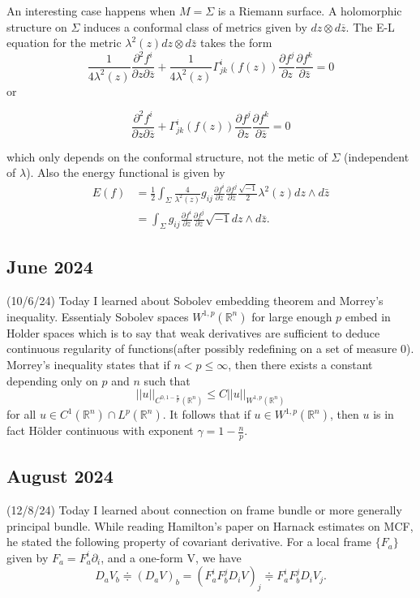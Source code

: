 \documentclass[12pt,a4paper]{article}
\newcommand{\R}{\mathbb{R}}
\begin{document}
An interesting case happens when $ M  = \Sigma$ is a Riemann surface. A holomorphic structure on $ \Sigma $ induces a conformal class of metrics given by $ dz \otimes d \overline{z} $. The E-L equation for the metric $ \lambda^{2}(z)dz \otimes d \bar{z} $ takes the form 
\[ \frac{1}{4\lambda^{2}(z)} \frac{\partial^{2}f^{i}}{\partial z \partial \overline{z}} + \frac{1}{4 \lambda^{2}(z)} \Gamma^{i}_{jk}(f(z)) \frac{\partial f^{j}}{\partial z}\frac{\partial f^{k}}{\partial \bar{z}} = 0\] or 

\[ \frac{\partial^{2}f^{i}}{\partial z \partial \overline{z}} + \Gamma^{i}_{jk}(f(z)) \frac{\partial f^{j}}{\partial z}\frac{\partial f^{k}}{\partial \bar{z}} = 0 \]

which only depends on the conformal structure, not the metic of $\Sigma $ (independent of $ \lambda $). Also the energy functional is given by 
\begin{align*}
    E(f) & =\frac{1}{2} \int_{\Sigma} \frac{4}{\lambda^2(z)} g_{i j} \frac{\partial f^i}{\partial z} \frac{\partial f^j}{\partial \bar{z}} \frac{\sqrt{-1}}{2} \lambda^2(z) d z \wedge d \bar{z} \\
    & =\int_{\Sigma} g_{i j} \frac{\partial f^i}{\partial z} \frac{\partial f^j}{\partial \bar{z}} \sqrt{-1} d z \wedge d \bar{z} .
    \end{align*}
\subsection*{June 2024}
\quad (10/6/24) Today I learned about Sobolev embedding theorem and Morrey's inequality. Essentialy Sobolev spaces $ W^{1,p}(\R^{n}) $ for large enough $ p $ embed in Holder spaces which is to say that weak derivatives are sufficient to deduce continuous regularity of functions(after possibly redefining on a set of measure $0$). Morrey's inequality states that if $n< p \le \infty$, then there exists a constant depending only on $ p $ and $n$ such that 
    \[ ||u||_{C^{0, 1 - \frac{n}{p}}(\R^{n})} \le C||u||_{W^{1,p}(\R^{n})} \]
for all $ u \in C^{1}(\R^{n}) \cap L^{p}(\R^{n}) $. It follows that if $  u \in W^{1,p}(\R^{n}) $, then $ u $ is in fact H\"older continuous with exponent $ \gamma  = 1 - \frac{n}{p}$.    

\subsection*{August 2024}
\quad(12/8/24) Today I learned about connection on frame bundle or more generally principal bundle. While reading Hamilton's paper on Harnack estimates on MCF, he stated the following property of covariant derivative. For a local frame $ \{F_{a}\} $ given by $ F_{a}=F_{a}^{i} \partial_{i} $, and a one-form V, we have 
\[ D_{a}V_{b} \doteqdot (D_{a}V)_{b} = (F_{a}^{i}F_{b}^{j}D_{i}V)_{j} \doteqdot  F_{a}^{i}F_{b}^{j}D_{i}V_{j}.  \]
\end{document}
